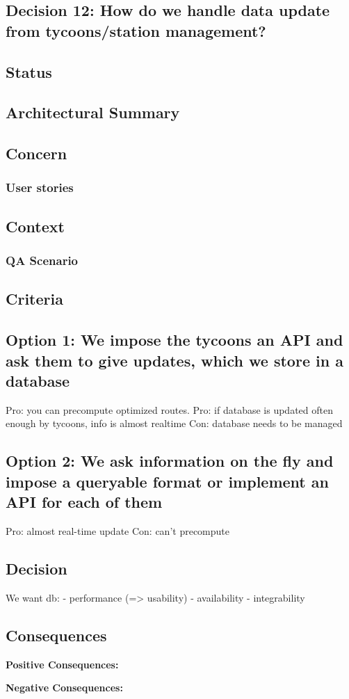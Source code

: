 \subsection{Decision 12: How do we handle data update from tycoons/station management?}

\subsection*{Status}

\subsection*{Architectural Summary}


\subsection*{Concern}
\subsubsection*{User stories}

\subsection*{Context}

\subsubsection*{QA Scenario} %

\subsection*{Criteria}
\begin{itemize}
\end{itemize}

\subsection*{Option 1: We impose the tycoons an API and ask them to give updates, which we store in a database}
Pro: you can precompute optimized routes.
Pro: if database is updated often enough by tycoons, info is almost realtime
Con: database needs to be managed

\subsection*{Option 2: We ask information on the fly and impose a queryable format or implement an API for each of them}
Pro: almost real-time update
Con: can't precompute

\subsection*{Decision}
We want db:
- performance (=> usability)
- availability 
- integrability

\subsection*{Consequences}
\textbf{Positive Consequences:}
\begin{itemize}
\end{itemize}
\textbf{Negative Consequences:}
\begin{itemize}
\end{itemize}